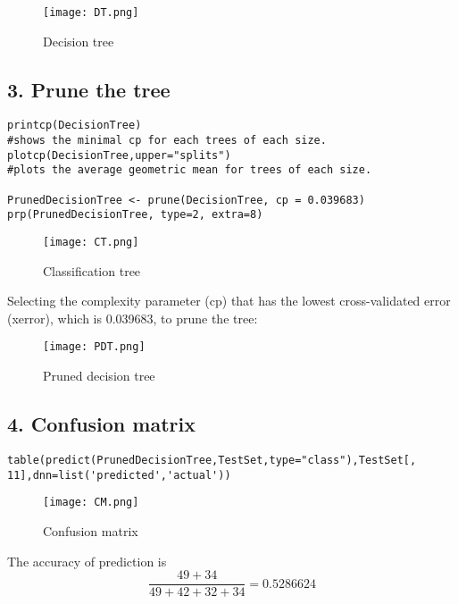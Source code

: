 \documentclass{article}
\begin{document}
\begin{figure}[H] 
\begin{center} 
\texttt{[image: DT.png]}  
\caption{Decision tree} 
\label{} 
\end{center} 
\end{figure}

\subsection*{3. Prune the tree}
\begin{verbatim}
printcp(DecisionTree)
#shows the minimal cp for each trees of each size.
plotcp(DecisionTree,upper="splits")
#plots the average geometric mean for trees of each size.

PrunedDecisionTree <- prune(DecisionTree, cp = 0.039683)
prp(PrunedDecisionTree, type=2, extra=8)
\end{verbatim}

\begin{figure}[H] 
\begin{center} 
\texttt{[image: CT.png]}  
\caption{Classification tree} 
\label{} 
\end{center} 
\end{figure}

Selecting the complexity parameter (cp) that has the lowest cross-validated error (xerror), which is 0.039683, to prune the tree:
\begin{figure}[H] 
\begin{center} 
\texttt{[image: PDT.png]}  
\caption{Pruned decision tree} 
\label{} 
\end{center} 
\end{figure}

\subsection*{4. Confusion matrix}
\begin{verbatim}
table(predict(PrunedDecisionTree,TestSet,type="class"),TestSet[, 11],dnn=list('predicted','actual'))
\end{verbatim}

\begin{figure}[H] 
\begin{center} 
\texttt{[image: CM.png]}  
\caption{Confusion matrix} 
\label{} 
\end{center} 
\end{figure}
The accuracy of prediction is 
\[\frac{{49 + 34}}{{49 + 42 + 32 + 34}} = 0.5286624\]
\end{document}
